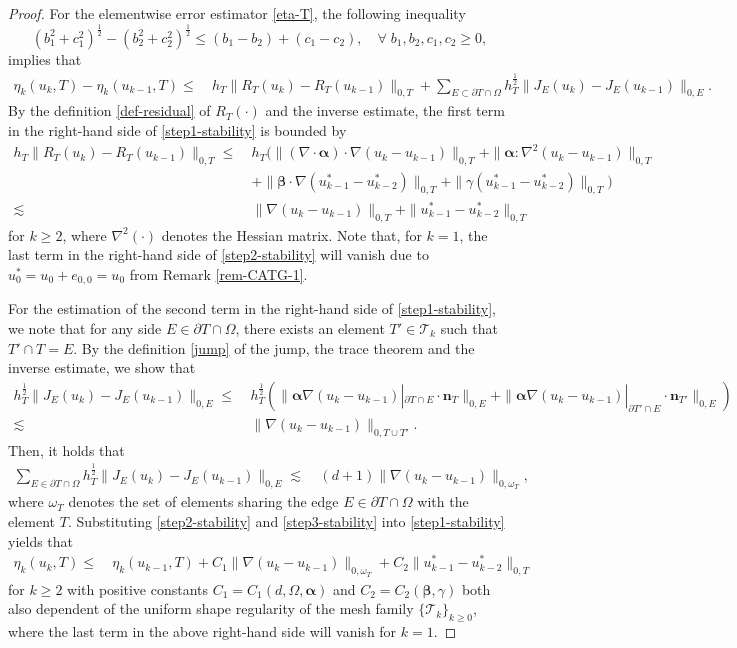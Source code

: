 \documentclass[preprint,times]{elsarticle}%
\numberwithin{algorithm}{section}
\numberwithin{equation}{section}
\newcommand{\vn}{\boldsymbol{n}}
\newcommand{\valpha}{\boldsymbol{\alpha}}
\newcommand{\vbeta}{\boldsymbol{\beta}}
\newcommand{\mcT}{\mathcal{T}}
\newcommand{\LtwD}[2]{\|#1\|_{0,#2}}
\newcommand{\LtwT}[1]{\|#1\|_{0,T}}
\newcommand{\LtwE}[1]{\|#1\|_{0,E}}
\def\leq{\leqslant}
\def\geq{\geqslant}
\begin{document}
\begin{proof}For the elementwise error estimator \eqref{eta-T}, the following inequality 
	$$
	(b_1^{2}+c_1^{2})^{\frac{1}{2}}-(b_2^{2}+c_2^{2})^{\frac{1}{2}}\leqslant (b_1-b_2) + (c_1 - c_2), \quad \forall \; b_1,b_2,c_1,c_2 \geqslant 0, 
	$$
implies that 
	\begin{align}
	\eta_k(u_k,T) - \eta_k(u_{k-1},T)
		\leq~&h_T\LtwT{R_T(u_k)-R_T(u_{k-1})}+ \sum_{E \subset \partial T\cap\Omega}h_T^\frac{1}{2}\LtwE{J_E(u_k)-J_E(u_{k-1})}. \label{step1-stability}
	\end{align}
By the definition \eqref{def-residual} of $R_T(\cdot)$ and the inverse estimate, the first term in the right-hand side of \eqref{step1-stability} is bounded by 
	\begin{align}
	h_T \LtwT{R_T(u_k)-R_T(u_{k-1})}  \leq~&
		h_T\Big(\LtwT{(\nabla\cdot\valpha)\cdot\nabla(u_k-u_{k-1})}
		+\LtwT{\valpha:\nabla^2(u_k-u_{k-1})}
		\nonumber\\
		&+\LtwT{\vbeta\cdot\nabla(u_{k-1}^*-u_{k-2}^*)}
		 +\LtwT{\gamma(u_{k-1}^*-u_{k-2}^*)}\Big)
		\nonumber\\
		\lesssim~& \LtwT{\nabla(u_k-u_{k-1})} + \LtwT{u_{k-1}^* - u_{k-2}^*}
		\label{step2-stability}
	\end{align}
for $k \geq 2$, where $\nabla^2(\cdot)$ denotes the Hessian matrix. Note that, for $k = 1$, the last term in the right-hand side of \eqref{step2-stability} will vanish due to $u_0^* = u_0 + e_{0,0} = u_0$ from Remark \ref{rem-CATG-1}. 

For the estimation of the second term in the right-hand side of \eqref{step1-stability}, we note that for any side $E \in \partial T \cap \Omega$, there exists an element $T' \in \mcT_k$ such that $T' \cap T=E$. By the definition \eqref{jump} of the jump, the trace theorem and the inverse estimate, we show that 
\begin{align}
	h_T^{\frac{1}{2}}\LtwE{J_E(u_k)-J_E(u_{k-1})}\leq~&
		h_T^\frac12(\LtwE{\valpha\nabla(u_k-u_{k-1})|_{\partial T \cap E}\cdot\vn_T}+\LtwE{\valpha\nabla(u_k-u_{k-1})|_{\partial T' \cap E}\cdot\vn_{T'}})
			\nonumber\\
		\lesssim~& \LtwD{\nabla(u_k-u_{k-1})}{T \cup T'}. 
			\nonumber
\end{align}
Then, it holds that 
	\begin{align}
		\sum_{E \in \partial T \cap \Omega}h_T^\frac12\LtwE{J_E(u_k)-J_E(u_{k-1})}
		\lesssim~&(d+1)\LtwD{\nabla(u_k-u_{k-1})}{\omega_T}, 
		\label{step3-stability}
	\end{align}
where $\omega_T$ denotes the set of elements sharing the edge $E \in \partial T \cap \Omega$ with the element $T$.  
Substituting \eqref{step2-stability} and \eqref{step3-stability} into \eqref{step1-stability} yields that 
	\begin{align}
		\eta_k(u_k,T) \leq~&  \eta_k(u_{k-1},T) +  C_1\LtwD{\nabla (u_k-u_{k-1})}{\omega_T} + C_2\LtwT{u_{k-1}^*-u_{k-2}^*} \nonumber
	\end{align}
for $k \geq 2$ with positive constants $C_1= C_1(d,\Omega,\valpha)$ and $C_2 = C_2(\vbeta,\gamma)$ both also dependent of the uniform shape regularity of the mesh family $\{\mcT_k\}_{k \geq 0}$, where the last term in the above right-hand side will vanish for $k = 1$. 


\end{proof}
\end{document}

